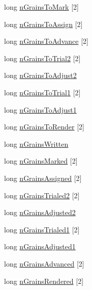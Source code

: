 \begin{DoxyCompactItemize}
long \hyperlink{class__sbsms___1_1_sub_band_a23a319af58bf3bb4462539d12e421a73}{n\+Grains\+To\+Mark} \mbox{[}2\mbox{]}
\item 
long \hyperlink{class__sbsms___1_1_sub_band_afae9ab227670db58e9f1003606fe15aa}{n\+Grains\+To\+Assign} \mbox{[}2\mbox{]}
\item 
long \hyperlink{class__sbsms___1_1_sub_band_aac6799c1d1882bb1830ee2bcc872443a}{n\+Grains\+To\+Advance} \mbox{[}2\mbox{]}
\item 
long \hyperlink{class__sbsms___1_1_sub_band_a1f318d161870737d8ebc93f62e44a315}{n\+Grains\+To\+Trial2} \mbox{[}2\mbox{]}
\item 
long \hyperlink{class__sbsms___1_1_sub_band_a3a46c5af5bfa462de5f43d1a692d95ce}{n\+Grains\+To\+Adjust2}
\item 
long \hyperlink{class__sbsms___1_1_sub_band_a2be889877be36d00c0840ca97cbc24ea}{n\+Grains\+To\+Trial1} \mbox{[}2\mbox{]}
\item 
long \hyperlink{class__sbsms___1_1_sub_band_ad71699f8a2251876939ccf818699aa28}{n\+Grains\+To\+Adjust1}
\item 
long \hyperlink{class__sbsms___1_1_sub_band_a1c1edb80b54fed8c6eeae9c765adb766}{n\+Grains\+To\+Render} \mbox{[}2\mbox{]}
\item 
long \hyperlink{class__sbsms___1_1_sub_band_a6b0d119fc4e40a34dd26eab7bca7c5e6}{n\+Grains\+Written}
\item 
long \hyperlink{class__sbsms___1_1_sub_band_a22b81dda2c1c45aec7e1a9820539757f}{n\+Grains\+Marked} \mbox{[}2\mbox{]}
\item 
long \hyperlink{class__sbsms___1_1_sub_band_a7aba12c3bc29ae31f2b2fb963c363d2b}{n\+Grains\+Assigned} \mbox{[}2\mbox{]}
\item 
long \hyperlink{class__sbsms___1_1_sub_band_a5cf274cd0e5731c644eda6826610b343}{n\+Grains\+Trialed2} \mbox{[}2\mbox{]}
\item 
long \hyperlink{class__sbsms___1_1_sub_band_a0429bd9695c1655fe379ef92128cd14f}{n\+Grains\+Adjusted2}
\item 
long \hyperlink{class__sbsms___1_1_sub_band_a16dedcd05c8c51a6b4ca574ec2899907}{n\+Grains\+Trialed1} \mbox{[}2\mbox{]}
\item 
long \hyperlink{class__sbsms___1_1_sub_band_abcad7665d8bb743805b8ec7650ef4410}{n\+Grains\+Adjusted1}
\item 
long \hyperlink{class__sbsms___1_1_sub_band_a2f2984bbc21730547cc3e332bf9feac9}{n\+Grains\+Advanced} \mbox{[}2\mbox{]}
\item 
long \hyperlink{class__sbsms___1_1_sub_band_a885e4cd7a56cf1daccb4e88343ff236e}{n\+Grains\+Rendered} \mbox{[}2\mbox{]}

\end{DoxyCompactItemize}
